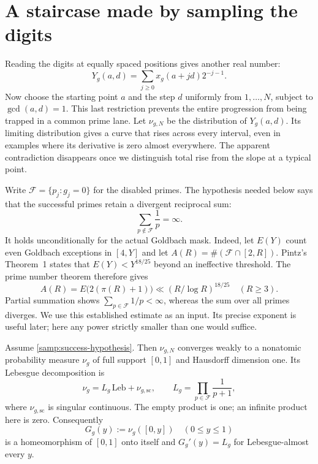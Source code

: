 \section{A staircase made by sampling the digits}
\label{samp:section}

Reading the digits at equally spaced positions gives another real number:
\[
 Y_g(a,d)=\sum_{j\ge0}x_g(a+jd)2^{-j-1}.
\]
Now choose the starting point $a$ and the step $d$ uniformly from
$1,\ldots,N$, subject to $\gcd(a,d)=1$.  This last restriction prevents
the entire progression from being trapped in a common prime lane.
Let $\nu_{g,N}$ be the distribution of $Y_g(a,d)$.  Its limiting
distribution gives a curve that rises across every interval, even in
examples where its derivative is zero almost everywhere.  The apparent
contradiction disappears once we distinguish total rise from the slope
at a typical point.

Write $\mathcal F=\{p_j:g_j=0\}$ for the disabled primes.  The hypothesis
needed below says that the successful primes retain a divergent
reciprocal sum:
\begin{equation}
 \sum_{p\notin\mathcal F}\frac1p=\infty.
 \label{samp:success-hypothesis}
\end{equation}
It holds unconditionally for the actual Goldbach mask.  Indeed, let
$E(Y)$ count even Goldbach exceptions in $[4,Y]$ and let
$A(R)=\#(\mathcal F\cap[2,R])$.  Pintz's Theorem~1
\cite{sampPintz2018} states that $E(Y)<Y^{18/25}$ beyond an
ineffective threshold.  The prime number theorem therefore gives
\begin{equation}
 A(R)=E\bigl(2(\pi(R)+1)\bigr)
 \ll (R/\log R)^{18/25} \quad(R\ge3).
 \label{samp:pintz}
\end{equation}
Partial summation shows $\sum_{p\in\mathcal F}1/p<\infty$, whereas
the sum over all primes diverges.  We use this established estimate
as an input.  Its precise exponent is useful later; here any power
strictly smaller than one would suffice.

\begin{theorem}\label{samp:staircase}
Assume \eqref{samp:success-hypothesis}.  Then $\nu_{g,N}$ converges
weakly to a nonatomic probability measure $\nu_g$ of full support
$[0,1]$ and Hausdorff dimension one.  Its Lebesgue decomposition is
\begin{equation}
 \nu_g=L_g\,\mathrm{Leb}+\nu_{g,\mathrm{sc}},\qquad
 L_g=\prod_{p\in\mathcal F}\frac1{p+1},
 \label{samp:decomposition}
\end{equation}
where $\nu_{g,\mathrm{sc}}$ is singular continuous.  The empty product
is one; an infinite product here is zero.  Consequently
\[
 G_g(y):=\nu_g([0,y])\quad(0\le y\le1)
\]
is a homeomorphism of $[0,1]$ onto itself and
$G_g'(y)=L_g$ for Lebesgue-almost every $y$.
\end{theorem}

